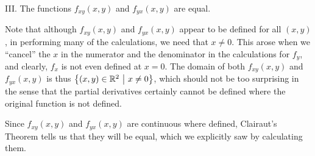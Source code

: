 \documentclass[noauthor,handout]{ximera}
\begin{document}
\begin{problem}
\begin{freeResponse}
III. The functions $f_{xy}(x,y)$ and $f_{yx}(x,y)$ are equal.  

\begin{remark}
Note that although $f_{xy}(x,y)$ and $f_{yx}(x,y)$ appear to be defined for all $(x,y)$, in performing many of the calculations, we need that $x \neq 0$.  This arose when we ``cancel'' the $x$ in the numerator and the denominator in the calculations for $f_y$, and clearly, $f_x$ is not even defined at $x=0$.  The domain of both $f_{xy}(x,y)$ and $f_{yx}(x,y)$ is thus $\left\{(x,y) \in \mathbb R^2 ~ \big| ~ x \neq 0\right\}$, which should not be too surprising in the sense that the partial derivatives certainly cannot be defined where the original function is not defined.

Since $f_{xy}(x,y)$ and $f_{yx}(x,y)$ are continuous where defined, Clairaut's Theorem tells us that they will be equal, which we explicitly saw by calculating them.
\end{remark}
\end{freeResponse}

\end{problem}

\end{document}
